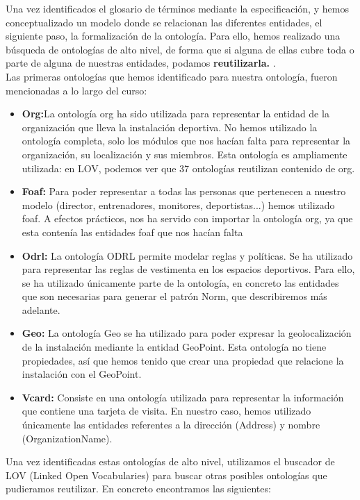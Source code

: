 \documentclass[a4paper,12pt]{article}
\begin{document}
	Una vez identificados el glosario de términos mediante la especificación, y hemos conceptualizado un modelo donde se relacionan las diferentes entidades, el siguiente paso, la formalización de la ontología. Para ello, hemos realizado una búsqueda de ontologías de alto nivel, de forma que si alguna de ellas cubre toda o parte de alguna de nuestras entidades, podamos \textbf{reutilizarla.
	}.\\
	Las primeras ontologías que hemos identificado para nuestra ontología, fueron mencionadas a lo largo del curso:
	\begin{itemize}
		\item \textbf{Org:}La ontología org ha sido utilizada para representar la entidad de la organización que lleva la instalación deportiva. No hemos utilizado la ontología completa, solo los módulos que nos hacían falta para representar la organización, su localización y sus miembros. Esta ontología es ampliamente utilizada: en LOV, podemos ver que 37 ontologías reutilizan contenido de org.
		\item \textbf{Foaf: }Para poder representar a todas las personas que pertenecen a nuestro modelo (director, entrenadores, monitores, deportistas...) hemos utilizado foaf. A efectos prácticos, nos ha servido con importar la ontología org, ya que esta contenía las entidades foaf que nos hacían falta
		\item \textbf{Odrl:} La ontología ODRL permite modelar reglas y políticas. Se ha utilizado para representar las reglas de vestimenta en los espacios deportivos. Para ello, se ha utilizado únicamente parte de la ontología, en concreto las entidades que son necesarias para generar el patrón Norm, que describiremos más adelante.
		\item \textbf{Geo:} La ontología Geo se ha utilizado para poder expresar la geolocalización de la instalación mediante la entidad GeoPoint. Esta ontología no tiene propiedades, así que hemos tenido que crear una propiedad que relacione la instalación con el GeoPoint. 
		\item \textbf{Vcard: }Consiste en una ontología utilizada para representar la información que contiene una tarjeta de visita. En nuestro caso, hemos utilizado únicamente las entidades referentes a la dirección (Address) y nombre (OrganizationName).
		
	\end{itemize}
	Una vez identificadas estas ontologías de alto nivel, utilizamos el buscador de LOV (Linked Open Vocabularies) para buscar otras posibles ontologías que pudieramos reutilizar. En concreto encontramos las siguientes:
	
\end{document}
